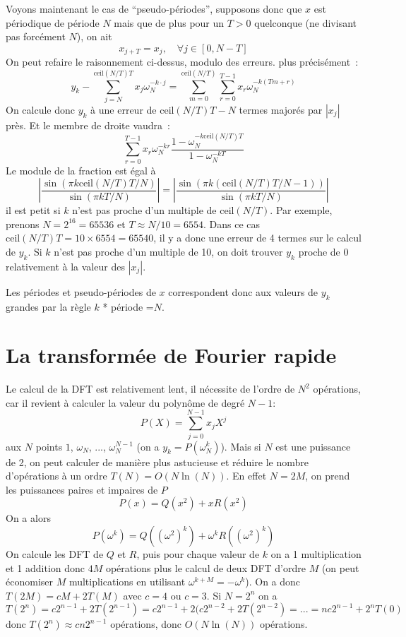 \documentclass[a4paper,11pt]{book}
\begin{document}
\begin{giacjshere}
Voyons maintenant le cas de ``pseudo-périodes'', supposons donc
que $x$ est périodique de période $N$ mais que de plus pour un $T>0$ 
quelconque (ne divisant pas forcément $N$), on ait
\[ x_{j+T}=x_j, \quad \forall j \in[0,N-T] \]
On peut refaire le raisonnement ci-dessus, modulo des erreurs.
plus précisément~:
\[ y_k - \sum_{j=N}^{\mbox{ceil}(N/T)T}x_j \omega_N^{-k\cdot j} 
= \sum_{m=0}^{\mbox{ceil}(N/T)} \sum_{r=0}^{T-1} x_r \omega_N^{-k (T m+r)} \]
On calcule donc $y_k$ à une erreur de $\mbox{ceil}(N/T)T-N$ termes majorés
par $|x_j|$ près.
Et le membre de droite vaudra~:
\[ \sum_{r=0}^{T-1} x_r \omega_N^{-kr} 
\frac{1-\omega_N^{-k\mbox{ceil}(N/T) T}}{1-\omega_N^{-kT}}
\]
Le module de la fraction est égal à
\[ |\frac{\sin(\pi k \mbox{ceil}(N/T) T/N)}{\sin(\pi k T/N)} |
= |\frac{\sin(\pi k (\mbox{ceil}(N/T) T/N-1))}{\sin(\pi k T/N)} |
\]
il est petit si $k$ n'est pas proche d'un multiple de $\mbox{ceil}(N/T)$.
Par exemple, prenons $N=2^16=65536$ et $T \approx N/10 =6554$. Dans
ce cas $\mbox{ceil}(N/T)T=10 \times 6554=65540$, il y a donc une erreur
de 4 termes sur le calcul de $y_k$. Si $k$ n'est pas proche d'un multiple
de 10, on doit trouver $y_k$ proche de 0 relativement à la valeur des $|x_j|$.

Les périodes et pseudo-périodes de $x$ correspondent donc aux
valeurs de $y_k$ grandes par la règle $k$ * période =$N$.

\section{La transformée de Fourier rapide} \label{sec:fft}
Le calcul de la DFT est relativement lent, il nécessite de l'ordre
de $N^2$ opérations, car il revient à calculer la valeur du polynôme
de degré $N-1$:
\[ P(X)=\sum_{j=0}^{N-1} x_j X^j \]
aux $N$ points $1$, $\omega_N$, ..., $\omega_N^{N-1}$ 
(on a $y_k=P(\omega_N^k)$).
Mais si $N$ est une puissance de 2, on peut calculer de manière plus
astucieuse et réduire le nombre d'opérations à un ordre $T(N)=O(N \ln(N))$.
En effet $N=2M$,
on prend les
puissances paires et impaires de $P$
$$ P(x)=Q(x^2)+xR(x^2)$$
On a alors
$$ P(\omega^k)=Q( (\omega^2)^k)+\omega^k R((\omega^2)^k)$$
On calcule les DFT de $Q$ et $R$, puis pour chaque valeur de $k$ on a
1 multiplication et 1 addition donc $4M$ op\'erations plus le calcul
de deux DFT d'ordre $M$ (on peut \'economiser $M$ multiplications
en utilisant $\omega^{k+M} =-\omega^k$). On a donc $T(2M)=cM+2T(M)$
avec $c=4$ ou $c=3$. Si $N=2^n$ on a 
$$T(2^n)=c2^{n-1}+2T(2^{n-1})
= c2^{n-1}+2(c2^{n-2}+2T(2^{n-2})
=...=nc2^{n-1}+2^nT(0)$$
donc $T(2^n) \approx cn2^{n-1}$ op\'erations, donc $O(N\ln(N))$
opérations.


\end{giacjshere}
\end{document}
